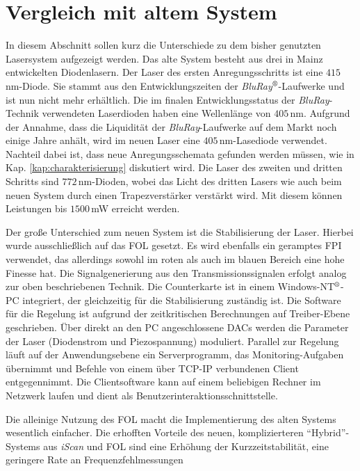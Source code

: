 \section{Vergleich mit altem System}\label{sec:vergleich_mit_altem_system}
In diesem Abschnitt sollen kurz die Unterschiede zu dem bisher genutzten
Lasersystem aufgezeigt werden. Das alte System besteht aus drei in Mainz
entwickelten Diodenlasern. Der Laser des ersten Anregungsschritts ist eine
$415\,$nm-Diode. Sie stammt aus den Entwicklungszeiten
der \textit{BluRay}$^\text{\textregistered}$-Laufwerke und ist nun nicht mehr
erhältlich. Die im finalen Entwicklungsstatus der \textit{BluRay}-Technik
verwendeten Laserdioden haben eine Wellenlänge von $405\,$nm. Aufgrund der
Annahme, dass die Liquidität der \textit{BluRay}-Laufwerke auf dem Markt noch
einige Jahre anhält, wird im neuen Laser eine $405\,$nm-Lasediode verwendet.
Nachteil dabei ist, dass neue Anregungsschemata gefunden werden müssen, wie in Kap.
\ref{kap:charakterisierung} diskutiert wird. Die Laser des zweiten und
dritten Schritts sind $772\,$nm-Dioden, wobei das Licht des dritten Lasers wie
auch beim neuen System durch einen Trapezverstärker verstärkt wird. Mit diesem
können Leistungen bis $1500\,$mW erreicht werden.\par
Der große Unterschied zum neuen System ist die Stabilisierung der Laser.
Hierbei wurde ausschließlich auf das FOL gesetzt. Es wird ebenfalls
ein geramptes FPI verwendet, das allerdings sowohl im roten als auch im blauen
Bereich eine hohe Finesse hat. Die Signalgenerierung aus den
Transmissionssignalen erfolgt analog zur oben beschriebenen Technik. Die
Counterkarte ist in einem Windows-NT$^\text{\textregistered}$-PC integriert, der
gleichzeitig für die Stabilisierung zuständig ist. Die Software für die Regelung
ist aufgrund der zeitkritischen Berechnungen auf Treiber-Ebene
geschrieben. Über direkt an den PC angeschlossene DACs werden die Parameter der
Laser (Diodenstrom und Piezospannung) moduliert. Parallel zur Regelung läuft auf
der Anwendungsebene ein Serverprogramm, das Monitoring-Aufgaben übernimmt und
Befehle von einem über TCP-IP verbundenen Client entgegennimmt. Die
Clientsoftware kann auf einem beliebigen Rechner im Netzwerk laufen und dient
als Benutzerinteraktionsschnittstelle.\par
Die alleinige Nutzung des FOL macht die Implementierung des
alten Systems wesentlich einfacher. Die erhofften Vorteile des neuen,
komplizierteren "`Hybrid"'-Systems aus \textit{iScan} und FOL
sind eine Erhöhung der Kurzzeitstabilität, eine geringere Rate an Frequenzfehlmessungen
